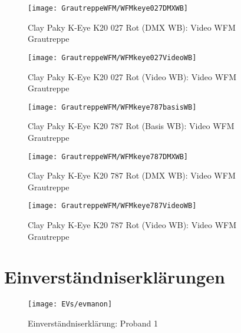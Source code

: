 \documentclass[pagesize,paper=A4,fontsize=12pt,utf8,numbers=noenddot,bibliography=totoc,listof=totoc,DIV=11,BCOR=1mm]{scrreprt}
\begin{document}
\begin{figure}[htp]     %
\centering
\texttt{[image: GrautreppeWFM/WFMkeye027DMXWB]} 
\caption {Clay Paky K-Eye K20 027 Rot (DMX WB): Video WFM Grautreppe} 
\end{figure}

\begin{figure}[htp]     %
\centering
\texttt{[image: GrautreppeWFM/WFMkeye027VideoWB]} 
\caption {Clay Paky K-Eye K20 027 Rot (Video WB): Video WFM Grautreppe} 
\end{figure}



\begin{figure}[htp]     %
\centering
\texttt{[image: GrautreppeWFM/WFMkeye787basisWB]} 
\caption {Clay Paky K-Eye K20 787 Rot (Basis WB): Video WFM Grautreppe} 
\end{figure}

\begin{figure}[htp]     %
\centering
\texttt{[image: GrautreppeWFM/WFMkeye787DMXWB]} 
\caption {Clay Paky K-Eye K20 787 Rot (DMX WB): Video WFM Grautreppe} 
\end{figure}

\begin{figure}[htp]     %
\centering
\texttt{[image: GrautreppeWFM/WFMkeye787VideoWB]} 
\caption {Clay Paky K-Eye K20 787 Rot (Video WB): Video WFM Grautreppe} 
\end{figure}



\section{Einverständniserklärungen}

\begin{figure}[htp]     %
\centering
\texttt{[image: EVs/evmanon]} 
\caption {Einverständniserklärung: Proband 1} 
\end{figure}
\end{document}

